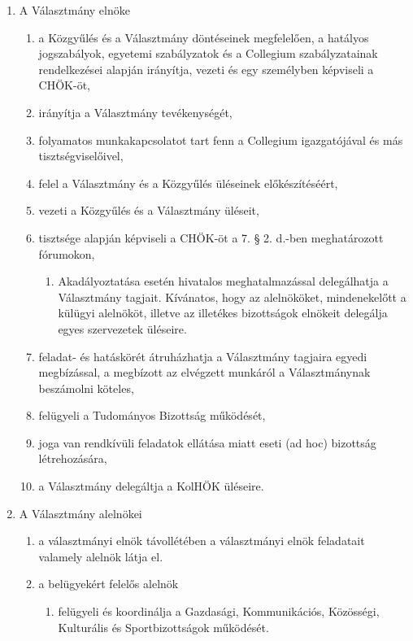 \documentclass{rulebook}
\begin{document}
\begin{enumerate}
\begin{enumerate}
	\end{enumerate}
	\item  A Választmány elnöke
	\begin{enumerate}	
		\item  a Közgyűlés és a Választmány döntéseinek megfelelően, a hatályos jogszabályok, egyetemi szabályzatok és a Collegium szabályzatainak rendelkezései alapján irányítja, vezeti és egy személyben képviseli a CHÖK-öt,
		\item  irányítja a Választmány tevékenységét,
		\item  folyamatos munkakapcsolatot tart fenn a Collegium igazgatójával és más tisztségviselőivel,
		\item  felel a Választmány és a Közgyűlés üléseinek előkészítéséért, 
		\item  vezeti a Közgyűlés és a Választmány üléseit,
		\item  tisztsége alapján képviseli a CHÖK-öt a 7. § 2. d.-ben meghatározott fórumokon,
		\begin{enumerate}
			\item Akadályoztatása esetén hivatalos meghatalmazással delegálhatja a Választmány tagjait. Kívánatos, hogy az alelnököket, mindenekelőtt a külügyi alelnököt, illetve az illetékes bizottságok elnökeit delegálja egyes szervezetek üléseire.
		\end{enumerate}
		\item  feladat- és hatáskörét átruházhatja a Választmány tagjaira egyedi megbízással, a megbízott az elvégzett munkáról a Választmánynak beszámolni köteles,
		\item  felügyeli a Tudományos Bizottság működését,
		\item  joga van rendkívüli feladatok ellátása miatt eseti (ad hoc) bizottság létrehozására,
		\item  a Választmány delegáltja a KolHÖK üléseire.
	\end{enumerate}
	\item  A Választmány alelnökei
		\begin{enumerate}	
		\item a választmányi elnök távollétében a választmányi elnök feladatait valamely alelnök látja el.
		\item a belügyekért felelős alelnök 
		\begin{enumerate}	
			\item felügyeli és koordinálja a Gazdasági, Kommunikációs, Közösségi, Kulturális és Sportbizottságok működését. 
		\end{enumerate}	

\end{enumerate}
\end{enumerate}
\end{document}
